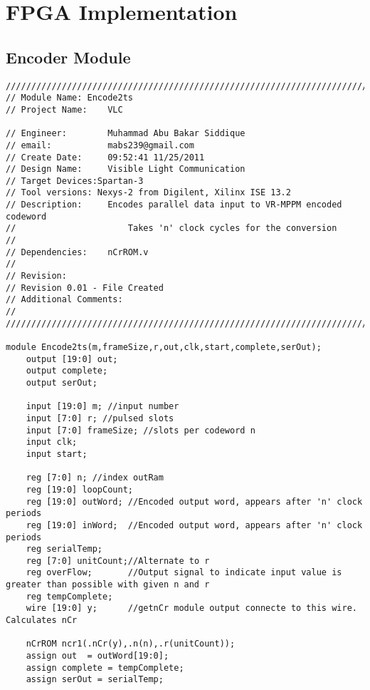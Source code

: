 \chapter{FPGA Implementation}
\label{AppendixB}

\section{Encoder Module}
\label{sec:Encode2ts}
\begin{lstlisting}[style=verilog-style,basicstyle=\tiny]
//////////////////////////////////////////////////////////////////////////////////
// Module Name:	Encode2ts
// Project Name: 	VLC

// Engineer: 		Muhammad Abu Bakar Siddique
// email:			mabs239@gmail.com
// Create Date:  	09:52:41 11/25/2011 
// Design Name: 	Visible Light Communication
// Target Devices:Spartan-3 
// Tool versions: Nexys-2 from Digilent, Xilinx ISE 13.2
// Description: 	Encodes parallel data input to VR-MPPM encoded codeword 
//						Takes 'n' clock cycles for the conversion
//
// Dependencies: 	nCrROM.v
//
// Revision: 
// Revision 0.01 - File Created
// Additional Comments: 
//
//////////////////////////////////////////////////////////////////////////////////

module Encode2ts(m,frameSize,r,out,clk,start,complete,serOut);
	output [19:0] out;
	output complete;
	output serOut;

	input [19:0] m; //input number
	input [7:0] r; //pulsed slots
	input [7:0] frameSize; //slots per codeword n
	input clk;
	input start;
  
	reg [7:0] n; //index outRam
	reg [19:0] loopCount;
  	reg [19:0] outWord;	//Encoded output word, appears after 'n' clock periods
	reg [19:0] inWord;	//Encoded output word, appears after 'n' clock periods
	reg serialTemp;
	reg [7:0] unitCount;//Alternate to r
	reg overFlow;		//Output signal to indicate input value is greater than possible with given n and r  
	reg tempComplete;
	wire [19:0] y;		//getnCr module output connecte to this wire. Calculates nCr

	nCrROM ncr1(.nCr(y),.n(n),.r(unitCount));
	assign out	= outWord[19:0];
	assign complete = tempComplete;
	assign serOut = serialTemp;


\end{lstlisting}
